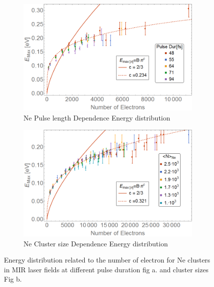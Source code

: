 \begin{figure}[h!]
\hfill
\begin{subfigure}[l]{0.48\textwidth}
\caption{Ne Pulse length Dependence Energy distribution}
\includegraphics[width=1\textwidth]{../Images/results/MIR_Ne_pulseduration/binned2.png} 
\end{subfigure} 
\begin{subfigure}[l]{0.48\textwidth}
\caption{Ne Cluster size Dependence Energy distribution}
\includegraphics[width=1\textwidth]{../Images/results/MIR_Ne_DropletSize/binned.png} 
\end{subfigure} 
\hfill
\caption[Energy-Number of electrons relation. Neon Droplets]{Energy distribution related to the number of electron for Ne clusters in MIR laser fields at different pulse duration fig a. and cluster sizes Fig b.}
\label{fig:Neenrgd}
\end{figure}

